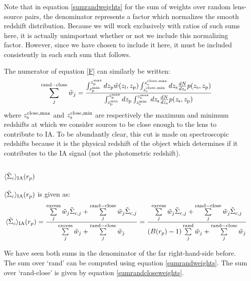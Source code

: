 \documentclass[onecolumn,amsmath,aps,fleqn, superscriptaddress]{revtex4}
\begin{document}
Note that in equation \ref{sumrandweights} for the sum of weights over random lens-source pairs, the denominator represents a factor which normalizes the smooth redshift distribution. Because we will work exclusively with ratios of such sums here, it is actually unimportant whether or not we include this normalizing factor. However, since we have chosen to include it here, it must be included consistently in each such sum that follows.

The numerator of equation \ref{F} can similarly be written:
\begin{equation}
\sum\limits_{j}^{\rm rand-close}\tilde{w}_j = \frac{\int_{z_{\rm p}^{\rm min}}^{z_{\rm p}^{\rm max}} d z_{\rm p} \tilde{w}(z_l, z_{\rm p}) \int_{z_{\rm s}^{\rm close, min}}^{z_{\rm s}^{\rm close, max}} dz_{\rm s} \frac{dN}{dz_{\rm s}} p(z_{\rm s}, z_{\rm p})}{\int_{z_{\rm p}^{\rm min}}^{z_{\rm p}^{\rm max}} d z_{\rm p} \int_{z_{\rm s}^{\rm min}}^{z_{\rm s}^{\rm max}} dz_{\rm s} \frac{dN}{dz_{\rm s}} p(z_{\rm s}, z_{\rm p})}
\label{sumrandcloseweights}
\end{equation}
where $z_{\rm s}^{\rm close,max}$ and $z_{\rm s}^{\rm close,min}$ are respectively the maximum and minimum redshifts at which we consider sources to be close enough to the lens to contribute to IA. To be abundantly clear, this cut is made on spectroscopic redshifts because it is the physical redshift of the object which determines if it contributes to the IA signal (not the photometric redshift). 

\subsection{$\langle \tilde{\Sigma}_c\rangle_{\rm IA}(r_p)$}

$\langle \tilde{\Sigma}_c\rangle_{\rm IA}(r_p)$ is given as:
\begin{equation}
\langle \tilde{\Sigma}_c\rangle_{\rm IA} (r_p) =  \frac{\sum\limits_{j}^{\rm excess} \tilde{w}_j \tilde{\Sigma}_{c,j}+ \sum\limits_{j}^{\rm rand-close} \tilde{w}_j \tilde{\Sigma}_{c,j}}{\sum\limits_{j}^{\rm excess} \tilde{w}_j + \sum\limits_{j}^{\rm rand-close} \tilde{w}_j}= \frac{\sum\limits_{j}^{\rm excess} \tilde{w}_j \tilde{\Sigma}_{c,j}+ \sum\limits_{j}^{\rm rand-close} \tilde{w}_j \tilde{\Sigma}_{c,j}}{(B(r_p)-1)\sum\limits_{j}^{\rm rand} \tilde{w}_j + \sum\limits_{j}^{\rm rand-close} \tilde{w}_j}
\label{SigmaIA}
\end{equation} 

We have seen both sums in the denominator of the far right-hand-side before. The sum over `rand' can be computed using equation \ref{sumrandweights}. The sum over `rand-close' is given by equation \ref{sumrandcloseweights}.
\end{document}
